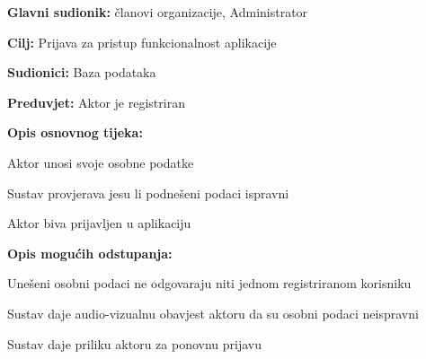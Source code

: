 					\noindent {}
					\begin{packed_item}
						
						\item \textbf{Glavni sudionik: }članovi organizacije, Administrator
						\item  \textbf{Cilj:} Prijava za pristup funkcionalnost aplikacije
						\item  \textbf{Sudionici:} Baza podataka
						\item  \textbf{Preduvjet:} Aktor je registriran
						\item  \textbf{Opis osnovnog tijeka:}
						
						\item[] \begin{packed_enum}
							
							\item Aktor unosi svoje osobne podatke
							\item Sustav provjerava jesu li podnešeni podaci ispravni
							\item Aktor biva prijavljen u aplikaciju
						\end{packed_enum}
						
						\item  \textbf{Opis mogućih odstupanja:}
						
						\item[] \begin{packed_item}
							
							\item[2.a] Unešeni osobni podaci ne odgovaraju niti jednom registriranom korisniku
							\item[] \begin{packed_enum}
								
								\item Sustav daje audio-vizualnu obavjest aktoru da su osobni podaci neispravni
								\item Sustav daje priliku aktoru za ponovnu prijavu
								
							\end{packed_enum}
							
						\end{packed_item}
					\end{packed_item}
				
